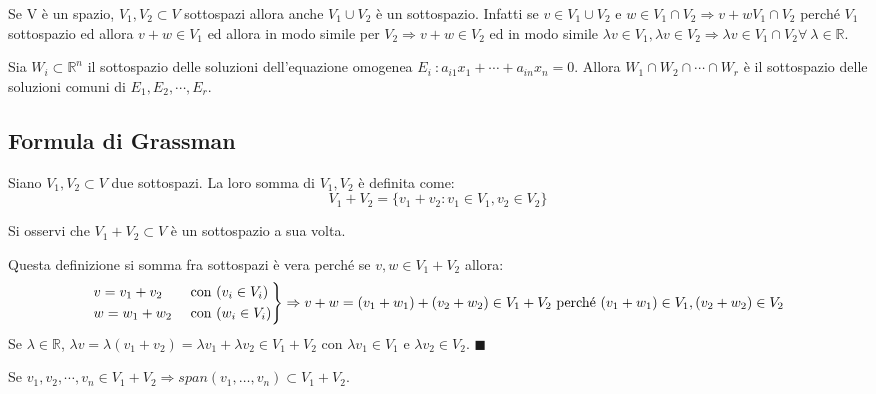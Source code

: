 \begin{observation}
Se V è un spazio, $V_1, V_2 \subset V$ sottospazi allora anche $V_1 \cup V_2$ è un sottospazio. Infatti se $v \in V_1 \cup V_2$ e $w \in V_1 \cap V_2 \Longrightarrow v+w V_1 \cap V_2$ perché $V_1$ sottospazio ed allora $v + w \in V_1$ ed allora in modo simile per $V_2 \Longrightarrow v + w \in V_2$ ed in modo simile $\lambda v \in V_1, \lambda v \in V_2 \Longrightarrow \lambda v \in V_1 \cap V_2 \forall \: \lambda \in \mathbb{R}$.
\end{observation}

\begin{example}
Sia $W_i \subset \mathbb{R}^n$ il sottospazio delle soluzioni dell'equazione omogenea $E_i \:: a_{i1}x_1 + \cdots + a_{in}x_n = 0$. Allora $W_1 \cap W_2 \cap \cdots \cap W_r$ è il sottospazio delle soluzioni comuni di $E_1, E_2, \cdots, E_r$.
\end{example}

\subsection{Formula di Grassman}
\begin{definition}
Siano $V_1, V_2 \subset V$ due sottospazi. La loro somma di $V_1, V_2$ è definita come:
\[V_1 + V_2 = \{v_1 + v_2 : v_1 \in V_1, v_2 \in V_2\}\]
\end{definition}

\begin{observation}
Si osservi che $V_1 + V_2 \subset V$ è un sottospazio a sua volta.
\end{observation}

\begin{demostration}
Questa definizione si somma fra sottospazi è vera perché se $v, w \in V_1 + V_2$ allora:
\[
\begin{rcases}
v = v_1 + v_2 & \text{ con } (v_i \in V_i)\\
w = w_1 + w_2 & \text{ con } (w_i \in V_i)
\end{rcases}
\Rightarrow v+w = (v_1 + w_1) + (v_2 + w_2) \in V_1 + V_2 \text{ perché }(v_1 + w_1) \in V_1, (v_2 + w_2) \in V_2
\]
Se $\lambda \in \mathbb{R}$, $\lambda v = \lambda(v_1 + v_2) = \lambda v_1 + \lambda v_2 \in V_1 + V_2$ con $\lambda v_1 \in V_1$ e $\lambda v_2 \in V_2$. $\blacksquare$
\end{demostration}

\begin{proposition}
Se $v_1, v_2, \cdots, v_n \in V_1 + V_2 \Longrightarrow span(v_1, \hdots, v_n) \subset V_1 + V_2$.
\end{proposition}

